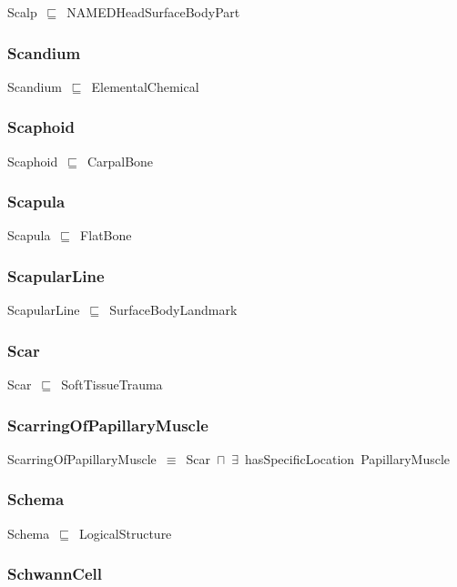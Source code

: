 \documentclass{article}
\begin{document}
Scalp~\ensuremath{\sqsubseteq}~NAMEDHeadSurfaceBodyPart~

\subsubsection*{Scandium}

Scandium~\ensuremath{\sqsubseteq}~ElementalChemical~

\subsubsection*{Scaphoid}

Scaphoid~\ensuremath{\sqsubseteq}~CarpalBone~

\subsubsection*{Scapula}

Scapula~\ensuremath{\sqsubseteq}~FlatBone~

\subsubsection*{ScapularLine}

ScapularLine~\ensuremath{\sqsubseteq}~SurfaceBodyLandmark~

\subsubsection*{Scar}

Scar~\ensuremath{\sqsubseteq}~SoftTissueTrauma~

\subsubsection*{ScarringOfPapillaryMuscle}

ScarringOfPapillaryMuscle~\ensuremath{\equiv}~Scar~\ensuremath{\sqcap}~\ensuremath{\exists}~hasSpecificLocation~PapillaryMuscle

\subsubsection*{Schema}

Schema~\ensuremath{\sqsubseteq}~LogicalStructure~

\subsubsection*{SchwannCell}
\end{document}
